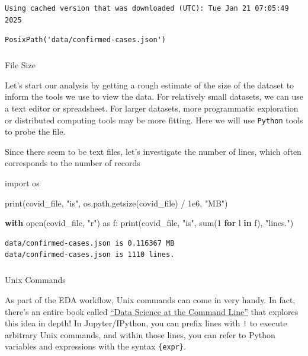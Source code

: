 \documentclass[
  letterpaper,
  DIV=11,
  numbers=noendperiod]{scrreprt}
\makeatletter
\let\oldsubparagraph\subparagraph
\renewcommand{\subparagraph}{
    \@ifstar
      \xxxSubParagraphStar
      \xxxSubParagraphNoStar
  }
\newcommand{\xxxSubParagraphStar}[1]{\oldsubparagraph*{#1}\mbox{}}
\newcommand{\xxxSubParagraphNoStar}[1]{\oldsubparagraph{#1}\mbox{}}
\newenvironment{Shaded}{\begin{snugshade}}{\end{snugshade}}
\newcommand{\BuiltInTok}[1]{\textcolor[rgb]{0.00,0.23,0.31}{#1}}
\newcommand{\ControlFlowTok}[1]{\textcolor[rgb]{0.00,0.23,0.31}{\textbf{#1}}}
\newcommand{\DecValTok}[1]{\textcolor[rgb]{0.68,0.00,0.00}{#1}}
\newcommand{\FloatTok}[1]{\textcolor[rgb]{0.68,0.00,0.00}{#1}}
\newcommand{\ImportTok}[1]{\textcolor[rgb]{0.00,0.46,0.62}{#1}}
\newcommand{\KeywordTok}[1]{\textcolor[rgb]{0.00,0.23,0.31}{\textbf{#1}}}
\newcommand{\NormalTok}[1]{\textcolor[rgb]{0.00,0.23,0.31}{#1}}
\newcommand{\OperatorTok}[1]{\textcolor[rgb]{0.37,0.37,0.37}{#1}}
\newcommand{\StringTok}[1]{\textcolor[rgb]{0.13,0.47,0.30}{#1}}
\makeatother
\begin{document}
\begin{verbatim}
Using cached version that was downloaded (UTC): Tue Jan 21 07:05:49 2025
\end{verbatim}

\begin{verbatim}
PosixPath('data/confirmed-cases.json')
\end{verbatim}

\subparagraph{File Size}\label{file-size}

Let's start our analysis by getting a rough estimate of the size of the
dataset to inform the tools we use to view the data. For relatively
small datasets, we can use a text editor or spreadsheet. For larger
datasets, more programmatic exploration or distributed computing tools
may be more fitting. Here we will use \texttt{Python} tools to probe the
file.

Since there seem to be text files, let's investigate the number of
lines, which often corresponds to the number of records

\begin{Shaded}
\begin{Highlighting}[]
\ImportTok{import}\NormalTok{ os}

\BuiltInTok{print}\NormalTok{(covid\_file, }\StringTok{"is"}\NormalTok{, os.path.getsize(covid\_file) }\OperatorTok{/} \FloatTok{1e6}\NormalTok{, }\StringTok{"MB"}\NormalTok{)}

\ControlFlowTok{with} \BuiltInTok{open}\NormalTok{(covid\_file, }\StringTok{"r"}\NormalTok{) }\ImportTok{as}\NormalTok{ f:}
    \BuiltInTok{print}\NormalTok{(covid\_file, }\StringTok{"is"}\NormalTok{, }\BuiltInTok{sum}\NormalTok{(}\DecValTok{1} \ControlFlowTok{for}\NormalTok{ l }\KeywordTok{in}\NormalTok{ f), }\StringTok{"lines."}\NormalTok{)}
\end{Highlighting}
\end{Shaded}

\begin{verbatim}
data/confirmed-cases.json is 0.116367 MB
data/confirmed-cases.json is 1110 lines.
\end{verbatim}

\subparagraph{Unix Commands}\label{unix-commands}

As part of the EDA workflow, Unix commands can come in very handy. In
fact, there's an entire book called
\href{https://datascienceatthecommandline.com/}{``Data Science at the
Command Line''} that explores this idea in depth! In Jupyter/IPython,
you can prefix lines with \texttt{!} to execute arbitrary Unix commands,
and within those lines, you can refer to Python variables and
expressions with the syntax \texttt{\{expr\}}.
\end{document}
